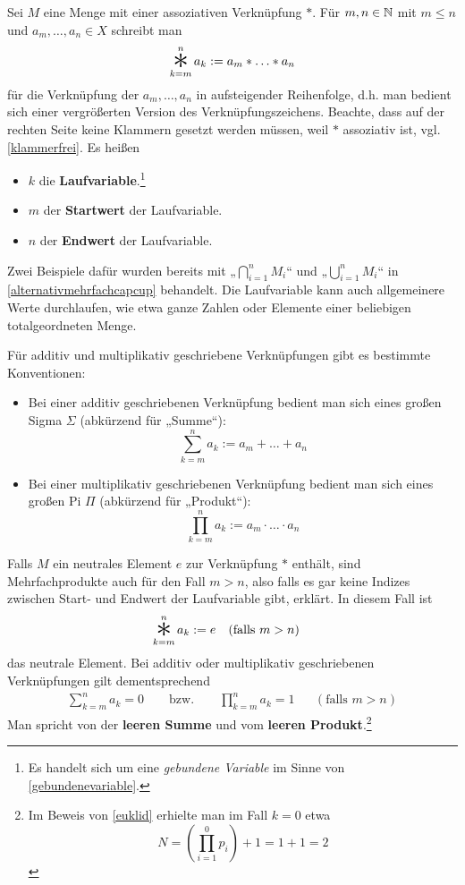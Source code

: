 \begin{nota}[Mehrfachprodukte] \label{mehrfachprodukt}
    Sei $M$ eine Menge mit einer assoziativen Verknüpfung $*$. Für $m,n\in \mathbb N$ mit $m\le n$ und $a_m,\dots , a_n\in X$ schreibt man
        \[ \mathop{\raisebox{-0.6ex}{\scalebox{2.5}{$*$}}}_{k=m}^n a_k := a_m * \ldots * a_n \]
    für die Verknüpfung der $a_m,\dots , a_n$ in aufsteigender Reihenfolge, d.h. man bedient sich einer vergrößerten Version des Verknüpfungszeichens. Beachte, dass auf der rechten Seite keine Klammern gesetzt werden müssen, weil $*$ assoziativ ist, vgl. \cref{klammerfrei}. Es heißen
    \begin{itemize}
        \item $k$ die \textbf{Laufvariable}.\footnote{Es handelt sich um eine \emph{gebundene Variable} im Sinne von \cref{gebundenevariable}.}
        \item $m$ der \textbf{Startwert} der Laufvariable.
        \item $n$ der \textbf{Endwert} der Laufvariable.
    \end{itemize}
    Zwei Beispiele dafür wurden bereits mit „$\bigcap_{i=1}^n M_i$“ und „$\bigcup_{i=1}^n M_i$“ in \cref{alternativmehrfachcapcup} behandelt. Die Laufvariable kann auch allgemeinere Werte durchlaufen, wie etwa ganze Zahlen oder Elemente einer beliebigen totalgeordneten Menge.
    
    Für additiv und multiplikativ geschriebene Verknüpfungen gibt es bestimmte Konventionen:
    \begin{itemize}
        \item Bei einer additiv geschriebenen Verknüpfung bedient man sich eines großen Sigma $\Sigma$ (abkürzend für „Summe“):
            \[ \sum_{k=m}^n a_k := a_m + \ldots + a_n \]
        \item Bei einer multiplikativ geschriebenen Verknüpfung bedient man sich eines großen Pi $\Pi$ (abkürzend für „Produkt“):
            \[ \prod_{k=m}^n a_k := a_m \cdot \ldots \cdot a_n \]
    \end{itemize}
    Falls $M$ ein neutrales Element $e$ zur Verknüpfung $*$ enthält, sind Mehrfachprodukte auch für den Fall $m>n$, also falls es gar keine Indizes zwischen Start- und Endwert der Laufvariable gibt, erklärt. In diesem Fall ist
    \begin{align*}
        \mathop{\raisebox{-0.6ex}{\scalebox{2.5}{$*$}}}_{k=m}^n a_k & := e && (\text{falls $m>n$})
    \end{align*}
    das neutrale Element. Bei additiv oder multiplikativ geschriebenen Verknüpfungen gilt dementsprechend
    \begin{align*}
        \sum_{k=m}^n a_k = 0 \qquad\text{bzw.}\qquad \prod_{k=m}^n a_k = 1 && (\text{falls $m>n$})
    \end{align*}
    Man spricht von der \textbf{leeren Summe} und vom \textbf{leeren Produkt}.\footnote{Im Beweis von \cref{euklid} erhielte man im Fall $k=0$ etwa \[ N = \left(\prod_{i=1}^0 p_i\right) + 1 = 1+1 = 2\]}
    

\end{nota}
